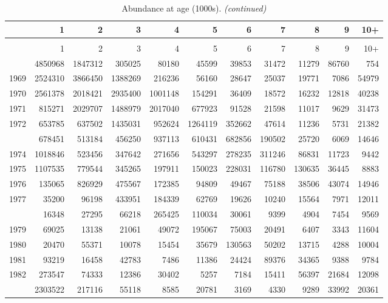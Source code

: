\documentclass[
]{article}
\begin{document}
\begin{longtable}[t]{lrrrrrrrrrr}
\caption{\label{tab:NAA-table}Abundance at age (1000s).}\\
\toprule
  & 1 & 2 & 3 & 4 & 5 & 6 & 7 & 8 & 9 & 10+\\
\midrule
\endfirsthead
\caption[]{Abundance at age (1000s). \textit{(continued)}}\\
\toprule
  & 1 & 2 & 3 & 4 & 5 & 6 & 7 & 8 & 9 & 10+\\
\midrule
\endhead

\endfoot
\bottomrule
\endlastfoot
1968 & 4850968 & 1847312 & 305025 & 80180 & 45599 & 39853 & 31472 & 11279 & 86760 & 754\\
1969 & 2524310 & 3866450 & 1388269 & 216236 & 56160 & 28647 & 25037 & 19771 & 7086 & 54979\\
1970 & 2561378 & 2018421 & 2935400 & 1001148 & 154291 & 36409 & 18572 & 16232 & 12818 & 40238\\
1971 & 815271 & 2029707 & 1488979 & 2017040 & 677923 & 91528 & 21598 & 11017 & 9629 & 31473\\
1972 & 653785 & 637502 & 1435031 & 952624 & 1264119 & 352662 & 47614 & 11236 & 5731 & 21382\\
\addlinespace
1973 & 678451 & 513184 & 456250 & 937113 & 610431 & 682856 & 190502 & 25720 & 6069 & 14646\\
1974 & 1018846 & 523456 & 347642 & 271656 & 543297 & 278235 & 311246 & 86831 & 11723 & 9442\\
1975 & 1107535 & 779544 & 345265 & 197911 & 150023 & 228031 & 116780 & 130635 & 36445 & 8883\\
1976 & 135065 & 826929 & 475567 & 172385 & 94809 & 49467 & 75188 & 38506 & 43074 & 14946\\
1977 & 35200 & 96198 & 433951 & 184339 & 62769 & 19626 & 10240 & 15564 & 7971 & 12011\\
\addlinespace
1978 & 16348 & 27295 & 66218 & 265425 & 110034 & 30061 & 9399 & 4904 & 7454 & 9569\\
1979 & 69025 & 13138 & 21061 & 49072 & 195067 & 75003 & 20491 & 6407 & 3343 & 11604\\
1980 & 20470 & 55371 & 10078 & 15454 & 35679 & 130563 & 50202 & 13715 & 4288 & 10004\\
1981 & 93219 & 16458 & 42783 & 7486 & 11386 & 24424 & 89376 & 34365 & 9388 & 9784\\
1982 & 273547 & 74333 & 12386 & 30402 & 5257 & 7184 & 15411 & 56397 & 21684 & 12098\\
\addlinespace
1983 & 2303522 & 217116 & 55118 & 8585 & 20781 & 3169 & 4330 & 9289 & 33992 & 20361\\

\end{longtable}
\end{document}
